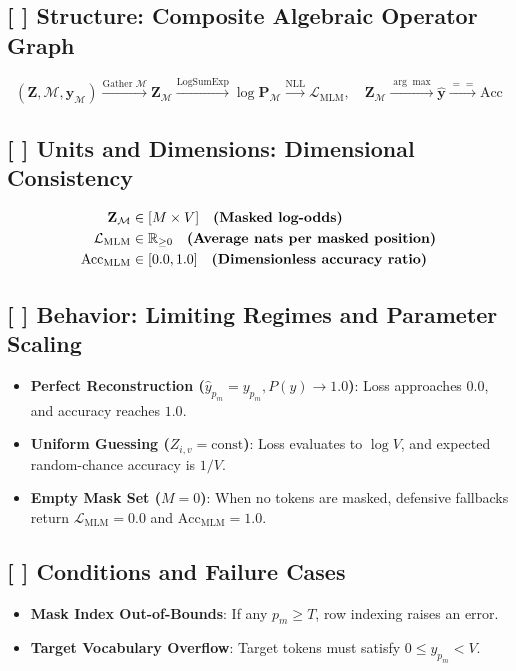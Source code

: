 \documentclass[11pt,a4paper]{article}
\theoremstyle{definition}
\begin{document}
\subsection{[ ] Structure: Composite Algebraic Operator Graph}
{\boldmath
\begin{equation}
(\mathbf{Z}, \mathcal{M}, \mathbf{y}_{\mathcal{M}}) \xrightarrow{\text{Gather } \mathcal{M}} \mathbf{Z}_{\mathcal{M}} \xrightarrow{\text{LogSumExp}} \log \mathbf{P}_{\mathcal{M}} \xrightarrow{\text{NLL}} \mathcal{L}_{\text{MLM}}, \quad \mathbf{Z}_{\mathcal{M}} \xrightarrow{\arg\max} \hat{\mathbf{y}} \xrightarrow{==} \text{Acc}
\end{equation}
}

\subsection{[ ] Units and Dimensions: Dimensional Consistency}
{\boldmath
\begin{align}
\mathbf{Z}_{\mathcal{M}} &\in [M \times V] \quad \text{\textbf{(Masked log-odds)}} \\
\mathcal{L}_{\text{MLM}} &\in \mathbb{R}_{\ge 0} \quad \text{\textbf{(Average nats per masked position)}} \\
\text{Acc}_{\text{MLM}} &\in [0.0, 1.0] \quad \text{\textbf{(Dimensionless accuracy ratio)}}
\end{align}
}

\subsection{[ ] Behavior: Limiting Regimes and Parameter Scaling}
\begin{itemize}
    \item \textbf{Perfect Reconstruction ($\hat{y}_{p_m} = y_{p_m}, P(y) \to 1.0$)}: Loss approaches $0.0$, and accuracy reaches $1.0$.
    \item \textbf{Uniform Guessing ($Z_{i, v} = \text{const}$)}: Loss evaluates to $\log V$, and expected random-chance accuracy is $1/V$.
    \item \textbf{Empty Mask Set ($M = 0$)}: When no tokens are masked, defensive fallbacks return $\mathcal{L}_{\text{MLM}} = 0.0$ and $\text{Acc}_{\text{MLM}} = 1.0$.
\end{itemize}

\subsection{[ ] Conditions and Failure Cases}
\begin{itemize}
    \item \textbf{Mask Index Out-of-Bounds}: If any $p_m \ge T$, row indexing raises an error.
    \item \textbf{Target Vocabulary Overflow}: Target tokens must satisfy $0 \le y_{p_m} < V$.
\end{itemize}
\end{document}
